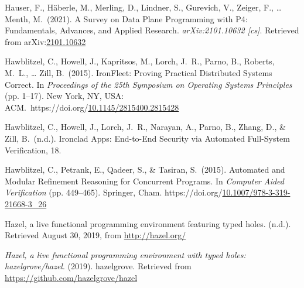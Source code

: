 \documentclass[12pt,twoside]{article}
\begin{document}
{\begin{thebibliography}{1079}
\mdbibitemlabel{}Hauser, F., Häberle, M., Merling, D., Lindner, S., Gurevich, V., Zeiger, F., … Menth, M.~(2021). A Survey on Data Plane Programming with P4: Fundamentals, Advances, and Applied Research. \emph{arXiv:2101.10632 {}[cs]}. Retrieved from arXiv:\href{http://arxiv.org/abs/2101.10632}{2101.10632}%

\mdbibitemlabel{}Hawblitzel, C., Howell, J., Kapritsos, M., Lorch, J.~R., Parno, B., Roberts, M.~L., … Zill, B.~(2015). IronFleet: Proving Practical Distributed Systems Correct. In \emph{Proceedings of the 25th Symposium on Operating Systems Principles} (pp. 1–17). New York, NY, USA: ACM.~https://doi.org/\href{https://dx.doi.org/10.1145/2815400.2815428}{10.1145/2815400.2815428}%

\mdbibitemlabel{}Hawblitzel, C., Howell, J., Lorch, J.~R., Narayan, A., Parno, B., Zhang, D., \& Zill, B.~(n.d.). Ironclad Apps: End-to-End Security via Automated Full-System Veriﬁcation, 18.%

\mdbibitemlabel{}Hawblitzel, C., Petrank, E., Qadeer, S., \& Tasiran, S.~(2015). Automated and Modular Refinement Reasoning for Concurrent Programs. In \emph{Computer Aided Verification} (pp. 449–465). Springer, Cham. https://doi.org/\href{https://dx.doi.org/10.1007/978-3-319-21668-3_26}{10.1007/978-3-319-21668-3\_26}%

\mdbibitemlabel{}Hazel, a live functional programming environment featuring typed holes. (n.d.). Retrieved August 30, 2019, from \href{http://hazel.org/}{{\ttfamily http://\hspace{0pt}hazel.\hspace{0pt}org/\hspace{0pt}}}%

\mdbibitemlabel{}\emph{Hazel, a live functional programming environment with typed holes: hazelgrove/hazel}. (2019). hazelgrove. Retrieved from \href{https://github.com/hazelgrove/hazel}{{\ttfamily https://\hspace{0pt}github.\hspace{0pt}com/\hspace{0pt}hazelgrove/\hspace{0pt}hazel}}%


\end{thebibliography}}
\end{document}
